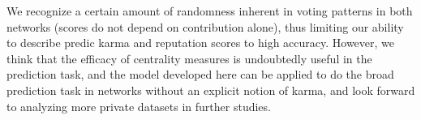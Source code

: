 \documentclass[11pt]{article}
\begin{document}
We recognize a certain amount of randomness inherent in voting patterns in both
networks (scores do not depend on contribution alone), thus limiting our ability
to describe predic karma and reputation scores to high accuracy. However, we
think that the efficacy of centrality measures is undoubtedly useful in the
prediction task, and the model developed here can be applied to do the broad
prediction task in networks without an explicit notion of karma, and look
forward to analyzing more private datasets in further studies.

{} 
\end{document}
